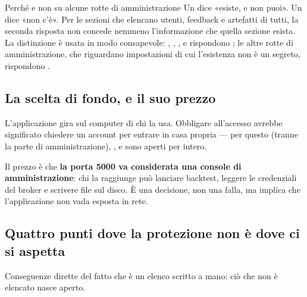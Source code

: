 \begin{perche}{Perché  e non  su alcune rotte di amministrazione}
Un  dice «esiste, e non puoi». Un  dice «non c'è». Per le
sezioni che elencano utenti, feedback e artefatti di tutti, la seconda
risposta non concede nemmeno l'informazione che quella sezione esista. La
distinzione è usata in modo consapevole: , ,
,  e 
rispondono ; le altre rotte di amministrazione, che riguardano
impostazioni di cui l'esistenza non è un segreto, rispondono .
\end{perche}

\subsection{La scelta di fondo, e il suo prezzo}

L'applicazione gira sul computer di chi la usa. Obbligare all'accesso avrebbe
significato chiedere un account per entrare in casa propria --- per questo
 (tranne la parte di amministrazione), ,
 e  sono aperti per intero.

Il prezzo è che \textbf{la porta \num{5000} va considerata una console di
amministrazione}: chi la raggiunge può lanciare backtest, leggere le
credenziali del broker e scrivere file sul disco. È una decisione, non una
falla, ma implica che l'applicazione non vada esposta in rete.

\subsection{Quattro punti dove la protezione non è dove ci si aspetta}

Conseguenze dirette del fatto che  è un elenco scritto
a mano: ciò che non è elencato nasce aperto.

